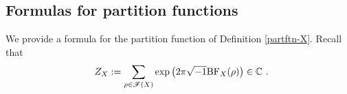 \documentclass[a4paper]{amsart}
\newtheorem{prop}[thm]{Proposition}
\theoremstyle{definition}
\numberwithin{equation}{section}
\begin{document}

\subsection{Formulas for partition functions}
 We provide a formula for the partition function of Definition \ref{partftn-X}.
 Recall that
\begin{align*}
    Z_X:=\sum_{\rho\in\mathscr{F}(X)}\exp\left(2\pi\sqrt{-1}\mathrm{BF}_X(\rho)\right)\in\mathbb{C}\rlap{\ .}
\end{align*}
 
\end{document}
